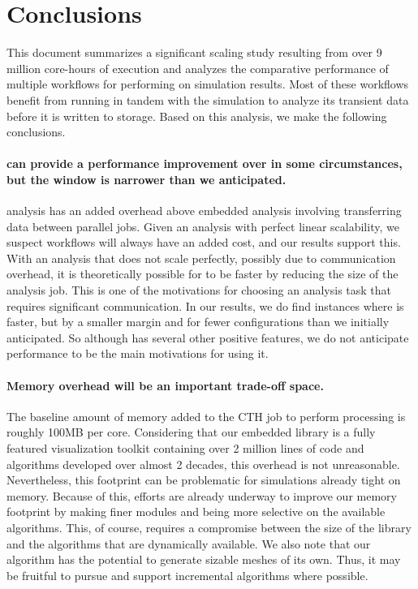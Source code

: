 \section{Conclusions}
\label{sec:Conclusion}

This document summarizes a significant scaling study resulting from over 9
million core-hours of execution and analyzes the comparative performance of
multiple workflows for performing \vda on simulation results.  Most of
these workflows benefit from running in tandem with the simulation to
analyze its transient data before it is written to storage.  Based on this
analysis, we make the following conclusions.

\paragraph{\Intransit can provide a performance improvement over \insitu in
  some circumstances, but the window is narrower than we anticipated.}  
\Intransit analysis has an added overhead above embedded
\insitu analysis involving transferring data between parallel jobs.  Given
an analysis with perfect linear scalability, we suspect \intransit
workflows will always have an added cost, and our results support this.
With an analysis that does not scale perfectly, possibly due to
communication overhead, it is theoretically possible for \intransit to be
faster by reducing the size of the analysis job.  This is one of the
motivations for choosing an analysis task that requires significant
communication.  In our results, we do find instances where \intransit is
faster, but by a smaller margin and for fewer configurations than we
initially anticipated.  So although \intransit has several other positive
features, we do not anticipate performance to be the main motivations for
using it.

\paragraph{Memory overhead will be an important trade-off space.}
The baseline amount of memory added to the CTH job to perform \insitu
processing is roughly 100MB per core.  Considering that our embedded
\insitu library is a fully featured visualization toolkit containing over 2
million lines of code and algorithms developed over almost 2 decades, this
overhead is not unreasonable.  Nevertheless, this footprint can be
problematic for simulations already tight on memory.  Because of this,
efforts are already underway to improve our memory footprint by making
finer modules and being more selective on the available algorithms.  This,
of course, requires a compromise between the size of the library and the
algorithms that are dynamically available.  We also note that our algorithm
has the potential to generate sizable meshes of its own.  Thus, it may be
fruitful to pursue and support incremental algorithms where possible.

